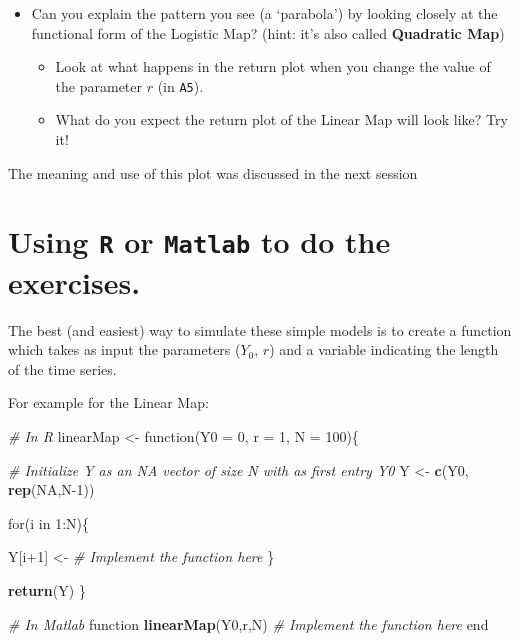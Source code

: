 \documentclass[]{book}
\newenvironment{Shaded}{\begin{snugshade}}{\end{snugshade}}
\newcommand{\KeywordTok}[1]{\textcolor[rgb]{0.13,0.29,0.53}{\textbf{{#1}}}}
\newcommand{\DataTypeTok}[1]{\textcolor[rgb]{0.13,0.29,0.53}{{#1}}}
\newcommand{\DecValTok}[1]{\textcolor[rgb]{0.00,0.00,0.81}{{#1}}}
\newcommand{\StringTok}[1]{\textcolor[rgb]{0.31,0.60,0.02}{{#1}}}
\newcommand{\CommentTok}[1]{\textcolor[rgb]{0.56,0.35,0.01}{\textit{{#1}}}}
\newcommand{\OtherTok}[1]{\textcolor[rgb]{0.56,0.35,0.01}{{#1}}}
\newcommand{\NormalTok}[1]{{#1}}
\providecommand{\tightlist}{%
  \setlength{\itemsep}{0pt}\setlength{\parskip}{0pt}}
\let\stdsection\section
\renewcommand\section{\newpage\stdsection}
\begin{document}
\begin{itemize}
\tightlist
\item
  Can you explain the pattern you see (a `parabola') by looking closely
  at the functional form of the Logistic Map? (hint: it's also called
  \textbf{Quadratic Map})

  \begin{itemize}
  \tightlist
  \item
    Look at what happens in the return plot when you change the value of
    the parameter \(r\) (in \texttt{A5}).
  \item
    What do you expect the return plot of the Linear Map will look like?
    Try it!
  \end{itemize}
\end{itemize}

The meaning and use of this plot was discussed in the next session

\section{\texorpdfstring{Using \texttt{R} or \texttt{Matlab} to do the
exercises.}{Using R or Matlab to do the exercises.}}\label{moc1R}

The best (and easiest) way to simulate these simple models is to create
a function which takes as input the parameters (\(Y_0\), \(r\)) and a
variable indicating the length of the time series.

For example for the Linear Map:

\begin{Shaded}
\begin{Highlighting}[]
\CommentTok{# In R}
\NormalTok{linearMap <-}\StringTok{ }\NormalTok{function(}\DataTypeTok{Y0 =} \DecValTok{0}\NormalTok{, }\DataTypeTok{r =} \DecValTok{1}\NormalTok{, }\DataTypeTok{N =} \DecValTok{100}\NormalTok{)\{}
    
    \CommentTok{# Initialize Y as an NA vector of size N with as first entry Y0}
    \NormalTok{Y <-}\StringTok{ }\KeywordTok{c}\NormalTok{(Y0, }\KeywordTok{rep}\NormalTok{(}\OtherTok{NA}\NormalTok{,N}\DecValTok{-1}\NormalTok{))}
    
    \NormalTok{for(i in }\DecValTok{1}\NormalTok{:N)\{}
        
    \NormalTok{Y[i}\DecValTok{+1}\NormalTok{] <-}\StringTok{ }\CommentTok{# Implement the function here}
\StringTok{        }
\StringTok{    }\NormalTok{\}}
    
    \KeywordTok{return}\NormalTok{(Y)}
\NormalTok{\}}


\CommentTok{# In Matlab}
\NormalTok{function }\KeywordTok{linearMap}\NormalTok{(Y0,r,N)}
 \CommentTok{# Implement the function here}
\NormalTok{end}
\end{Highlighting}
\end{Shaded}
\end{document}
